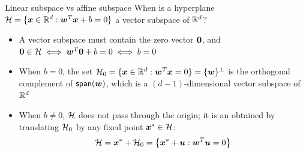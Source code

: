 \documentclass[aspectratio=169]{beamer}\usepackage[]{graphicx}\usepackage[]{xcolor}
\begin{document}
\begin{frame}{Linear subspace vs affine subspace}
    When is a hyperplane $\mathcal{H} = \{\bm{x} \in \mathbb{R}^d : \bm{w}^T \bm{x} + b = 0\}$ a vector subspace of $\mathbb{R}^d$?
    \vfill
    \begin{itemize}
        \item A vector subspace must contain the zero vector $\b0$, and $\b0 \in \H \iff \bw^T \b0 + b = 0 \iff b = 0$
        \vfill
        \item When $b = 0$, the set $\mathcal{H}_0 = \{\bm{x} \in \mathbb{R}^d : \bm{w}^T \bm{x} = 0\} = \{\bm{w}\}^\perp$ is the orthogonal complement of $\mathsf{span}(\bm{w})$, which is a $(d-1)$-dimensional vector subspace of $\mathbb{R}^d$
        \vfill
        \item When $b \neq 0$, $\mathcal{H}$ does not pass through the origin; it is an  obtained by translating $\mathcal{H}_0$ by any fixed point $\bm{x}^* \in \mathcal{H}$:
        \[
            \mathcal{H} = \bm{x}^* + \mathcal{H}_0 = \left\{\bm{x}^* + \bm{u} : \bm{w}^T \bm{u} = 0\right\}
        \]
    \end{itemize}
\end{frame}
\end{document}
